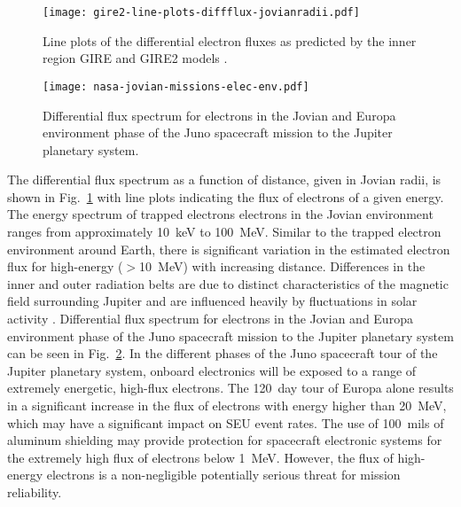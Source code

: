 \begin{figure}[tb]
    \begin{center}
        \texttt{[image: gire2-line-plots-diffflux-jovianradii.pdf]}
    \end{center}
    \caption[Line plots of the differential electron fluxes as predicted by the inner region GIRE and GIRE2 models.]{Line plots of the differential electron fluxes as predicted by the inner region GIRE and GIRE2 models \cite{garrett2012galileo}.}
    \label{fig:gire2-diff-flux}
\end{figure}
\begin{figure}[tb]
    \begin{center}
        \texttt{[image: nasa-jovian-missions-elec-env.pdf]}
    \end{center}
    \caption{Differential flux spectrum for electrons in the Jovian and Europa environment phase of the Juno spacecraft mission to the Jupiter planetary system.}
    \label{fig:jovian-int-flux-spectrum}
\end{figure}

The differential flux spectrum as a function of distance, given in Jovian radii, is shown in Fig.~\ref{fig:gire2-diff-flux} with line plots indicating the flux of electrons of a given energy.
The energy spectrum of trapped electrons electrons in the Jovian environment ranges from approximately 10~keV to 100~MeV.
Similar to the trapped electron environment around Earth, there is significant variation in the estimated electron flux for high-energy ($>$10~MeV) with increasing distance.
Differences in the inner and outer radiation belts are due to distinct characteristics of the magnetic field surrounding Jupiter and are influenced heavily by fluctuations in solar activity \cite{garrett2012galileo}. 
Differential flux spectrum for electrons in the Jovian and Europa environment phase of the Juno spacecraft mission to the Jupiter planetary system can be seen in Fig.~\ref{fig:jovian-int-flux-spectrum}.
In the different phases of the Juno spacecraft tour of the Jupiter planetary system, onboard electronics will be exposed to a range of extremely energetic, high-flux electrons.
The 120~day tour of Europa alone results in a significant increase in the flux of electrons with energy higher than 20~MeV, which may have a significant impact on SEU event rates.
The use of 100~mils of aluminum shielding may provide protection for spacecraft electronic systems for the extremely high flux of electrons below 1~MeV. 
However, the flux of high-energy electrons is a non-negligible potentially serious threat for mission reliability. 

